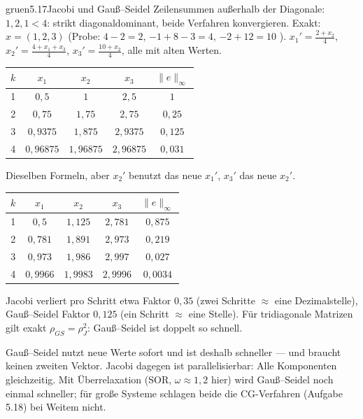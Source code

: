 \begin{loesungkarte}{gruen}{5.17}{Jacobi und Gauß--Seidel}
Zeilensummen außerhalb der Diagonale: $1, 2, 1 < 4$: strikt diagonaldominant, beide Verfahren konvergieren. Exakt: $x = (1, 2, 3)$ (Probe: $4 - 2 = 2$, $-1 + 8 - 3 = 4$, $-2 + 12 = 10$ \checkmark).
$x_1' = \frac{2 + x_2}4$, $x_2' = \frac{4 + x_1 + x_3}4$, $x_3' = \frac{10 + x_2}4$, alle mit alten Werten.
\begin{center}\small
\begin{tabular}{c|ccc|c}
$k$ & $x_1$ & $x_2$ & $x_3$ & $\|e\|_\infty$\\ \hline
1 & $0{,}5$ & $1$ & $2{,}5$ & $1$\\
2 & $0{,}75$ & $1{,}75$ & $2{,}75$ & $0{,}25$\\
3 & $0{,}9375$ & $1{,}875$ & $2{,}9375$ & $0{,}125$\\
4 & $0{,}96875$ & $1{,}96875$ & $2{,}96875$ & $0{,}031$
\end{tabular}
\end{center}
Dieselben Formeln, aber $x_2'$ benutzt das neue $x_1'$, $x_3'$ das neue $x_2'$.
\begin{center}\small
\begin{tabular}{c|ccc|c}
$k$ & $x_1$ & $x_2$ & $x_3$ & $\|e\|_\infty$\\ \hline
1 & $0{,}5$ & $1{,}125$ & $2{,}781$ & $0{,}875$\\
2 & $0{,}781$ & $1{,}891$ & $2{,}973$ & $0{,}219$\\
3 & $0{,}973$ & $1{,}986$ & $2{,}997$ & $0{,}027$\\
4 & $0{,}9966$ & $1{,}9983$ & $2{,}9996$ & $0{,}0034$
\end{tabular}
\end{center}
Jacobi verliert pro Schritt etwa Faktor $0{,}35$ (zwei Schritte $\approx$ eine Dezimalstelle), Gauß--Seidel Faktor $0{,}125$ (ein Schritt $\approx$ eine Stelle). Für tridiagonale Matrizen gilt exakt $\rho_{GS} = \rho_J^{2}$: Gauß--Seidel ist doppelt so schnell.
\begin{mitnehmen}\kastentext
Gauß--Seidel nutzt neue Werte sofort und ist deshalb schneller --- und braucht keinen zweiten Vektor. Jacobi dagegen ist parallelisierbar: Alle Komponenten gleichzeitig. Mit Überrelaxation (SOR, $\omega\approx1{,}2$ hier) wird Gauß--Seidel noch einmal schneller; für große Systeme schlagen beide die CG-Verfahren (Aufgabe 5.18) bei Weitem nicht.
\end{mitnehmen}
\end{loesungkarte}

